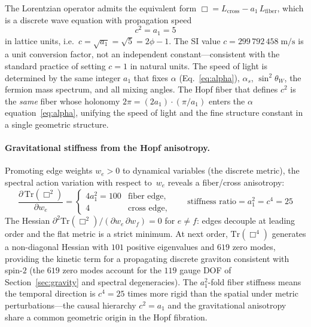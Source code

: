 \documentclass[12pt,a4paper]{article}
\theoremstyle{definition}
\begin{document}
The Lorentzian operator admits the equivalent form $\Box = L_{\mathrm{cross}} - a_1\, L_{\mathrm{fiber}}$, which is a discrete wave equation with propagation speed
\begin{equation}
\boxed{c^2 = a_1 = 5}
\label{eq:c_squared}
\end{equation}
in lattice units, i.e.\ $c = \sqrt{a_1} = \sqrt{5} = 2\phi - 1$.  The SI value $c = 299\,792\,458\;\mathrm{m/s}$ is a unit conversion factor, not an independent constant---consistent with the standard practice of setting $c = 1$ in natural units.  The speed of light is determined by the same integer $a_1$ that fixes $\alpha$ (Eq.~\ref{eq:alpha}), $\alpha_s$, $\sin^2\theta_W$, the fermion mass spectrum, and all mixing angles.  The Hopf fiber that defines $c^2$ is the \emph{same} fiber whose holonomy $2\pi = (2a_1)\cdot(\pi/a_1)$ enters the $\alpha$ equation~\eqref{eq:alpha}, unifying the speed of light and the fine structure constant in a single geometric structure.

\paragraph{Gravitational stiffness from the Hopf anisotropy.}
Promoting edge weights $w_e > 0$ to dynamical variables (the discrete metric), the spectral action variation with respect to~$w_e$ reveals a fiber/cross anisotropy:
\begin{equation}
\frac{\partial\,\mathrm{Tr}(\Box^2)}{\partial w_e} =
\begin{cases}
4a_1^2 = 100 & \text{fiber edge},\\[2pt]
4 & \text{cross edge},
\end{cases}
\qquad
\boxed{\text{stiffness ratio} = a_1^2 = c^4 = 25}
\label{eq:gravitational_stiffness}
\end{equation}
The Hessian $\partial^2\mathrm{Tr}(\Box^2)/(\partial w_e\,\partial w_f) = 0$ for $e \ne f$: edges decouple at leading order and the flat metric is a strict minimum.  At next order, $\mathrm{Tr}(\Box^4)$ generates a non-diagonal Hessian with $101$ positive eigenvalues and $619$ zero modes, providing the kinetic term for a propagating discrete graviton consistent with spin-$2$ (the $619$ zero modes account for the $119$ gauge DOF of Section~\ref{sec:gravity} and spectral degeneracies).  The $a_1^2$-fold fiber stiffness means the temporal direction is $c^4 = 25$ times more rigid than the spatial under metric perturbations---the causal hierarchy $c^2 = a_1$ and the gravitational anisotropy share a common geometric origin in the Hopf fibration.
\end{document}
